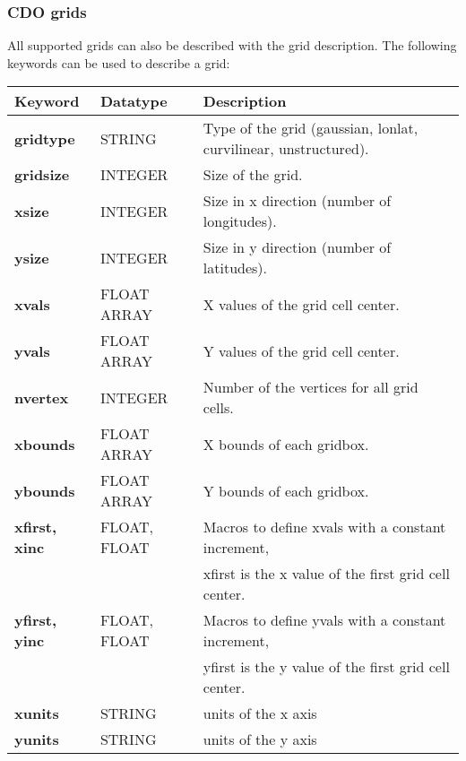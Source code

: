 \subsubsection{CDO grids}

All supported grids can also be described with the {\CDO} grid description.
The following keywords can be used to describe a grid:

\vspace{3mm}
\begin{tabular}[b]{lll}
Keyword           & Datatype     & Description \\ \hline
\textbf{gridtype}     & STRING       & Type of the grid (gaussian, lonlat, curvilinear, unstructured). \\
\textbf{gridsize}     & INTEGER      & Size of the grid. \\
\textbf{xsize}        & INTEGER      & Size in x direction (number of longitudes). \\
\textbf{ysize}        & INTEGER      & Size in y direction (number of latitudes). \\
\textbf{xvals}        & FLOAT ARRAY  & X values of the grid cell center. \\
\textbf{yvals}        & FLOAT ARRAY  & Y values of the grid cell center.\\
\textbf{nvertex}      & INTEGER      & Number of the vertices for all grid cells. \\
\textbf{xbounds}      & FLOAT ARRAY  & X bounds of each gridbox. \\
\textbf{ybounds}      & FLOAT ARRAY  & Y bounds of each gridbox. \\
\textbf{xfirst, xinc} & FLOAT, FLOAT & Macros to define xvals with a constant increment, \\
                         &                         & xfirst is the x value of the first grid cell center. \\
\textbf{yfirst, yinc} & FLOAT, FLOAT & Macros to define yvals with a constant increment, \\
                         &                         & yfirst is the y value of the first grid cell center. \\
\textbf{xunits}       & STRING       & units of the x axis \\
\textbf{yunits}       & STRING       & units of the y axis \\
\end{tabular}

